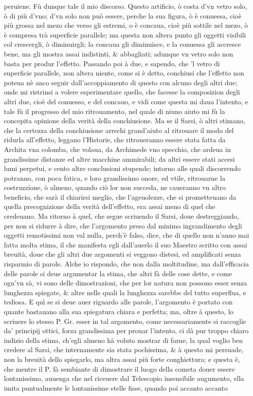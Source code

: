 \documentclass[11pt,twoside,openany]{book}
\begin{document}
peruiene. Fù dunque tale il mio discorso. Questo artificio, ò costa d'vn vetro solo, ò di più d'vno; d'vn solo non può essere, perche la sua figura, ò è conuessa, cioè più grossa nel mezo che verso gli estremi, o è concaua, cioè più sottile nel mezo, ò è compresa trà superficie parallele; ma questa non altera punto gli oggetti visibili col crescergli, ò diminuirgli; la concaua gli diminuisce, e la conuessa gli accresce bene, ma gli mostra assai indistinti, \& abbagliati; adunque vn vetro solo non basta per produr l'effetto. Passando poi à due, e sapendo, che 'l vetro di superficie parallele, non altera niente, come si è detto, conchiusi che l'effetto non poteua nè anco seguir dall'accoppiamento di questo con alcuno degli altri due; onde mi ristrinsi a volere esperimentare quello, che facesse la composizion degli altri due, cioè del conuesso, e del concauo, e vidi come questa mi daua l'intento, e tale fù il progresso del mio ritrouamento, nel quale di niuno aiuto mi fù la concepita opinione della verità della conchiusione. Ma se il Sarsi, ò altri stimano, che la certezza della conchiusione arrechi grand'aiuto al ritrouare il modo del ridurla all'effetto, leggano l'Historie, che ritroueranno essere stata fatta da Archita vna colomba, che volaua, da Archimede vno specchio, che ardeua in grandissime distanze ed altre macchine ammirabili; da altri essere stati accesi lumi perpetui, e cento altre conclusioni stupende; intorno alle quali discorrendo potranno, con poca fatica, e loro grandissimo onore, ed vtile, ritrouarne la costruzzione, ò almeno, quando ciò lor non succeda, ne caueranno vn altro beneficio, che sarà il chiarirsi meglio, che l'ageuolezze, che si prometteuano da quella precognizione della verità dell'effetto, era assai meno di quel che credeuano. Ma ritorno à quel, che segue scriuendo il Sarsi, doue destreggiando, per non si ridurre à dire, che l'argomento preso dal minimo ingrandimento degli oggetti remotissimi non val nulla, perch'è falso, dice, che di quello non n'anno mai fatta molta stima, il che manifesta egli dall'auerlo il suo Maestro scritto con assai breuità, doue che gli altri due argomenti si veggono distesi, ed amplificati senza risparmio di parole. Alche io rispondo, che non dalla moltitudine, ma dall'efficacia delle parole si deue argumentar la stima, che altri fà delle cose dette, e come ogn'vn sà, vi sono delle dimostrazioni, che per lor natura non possono esser senza lunghezza spiegate, \& altre nelle quali la lunghezza sarebbe del tutto superflua, e tediosa. E quì se si deue auer riguardo alle parole, l'argomento è portato con quante bastauano alla sua spiegatura chiara e perfetta; ma, oltre à questo, lo scriuere lo stesso P. Gr. esser in tal argomento, come necessariamente si raccoglie da' principij ottici, forza grandissima per prouar l'intento, ci dà pur troppo chiaro indizio della stima, ch'egli almeno hà voluto mostrar di farne, la qual voglio ben credere al Sarsi, che internamente sia stata pochissima, \& à questo mi persuade, non la breuità dello spiegarlo, ma altra assai più forte conghiettura; e questa è, che mentre il P. fà sembiante di dimostrare il luogo della cometa douer essere lontanissimo, auuenga che nel riceuere dal Telescopio insensibile augumento, ella imita puntualmente le lontanissime stelle fisse, quando poi accanto accanto 
\end{document}
